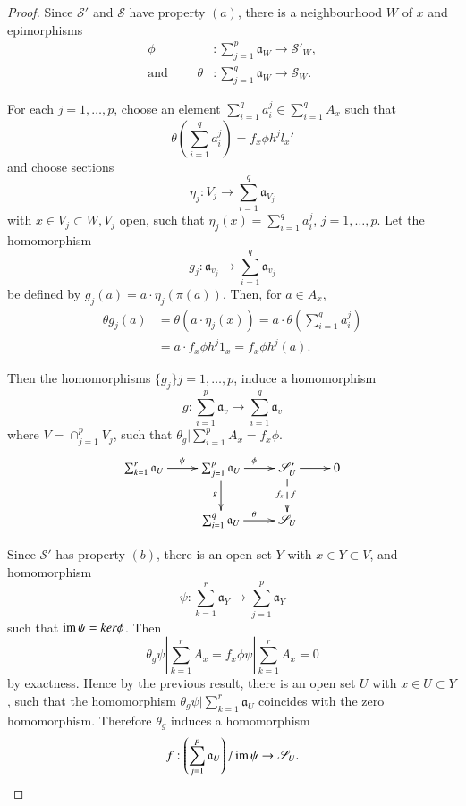 \begin{proof}
Since $\mathscr{S'}$ and $\mathscr{S}$ have property $(a)$, there is a
neighbourhood $W$ of $x$ and epimorphisms 
\begin{align*}
\phi & : \sum^p_{j=1} \mathfrak{a}_W \rightarrow \mathscr{S'}_W , \\
\text{and } \qquad  
\theta & : \sum^q_{j=1} \mathfrak{a}_W \rightarrow \mathscr{S}_W.
\end{align*}

For each $j = 1, \ldots , p$, choose an element $\sum^q_{i=1} a^j_i
\in \sum^q_{i=1} A_x$ such that  
$$
\theta \left(\sum^q_{i=1} a^j_i \right) = f_x \phi h^j l_x'
$$
and choose sections
$$
\eta_j : V_j \rightarrow \sum^q_{i=1} \mathfrak{a}_{V_j} 
$$
with $x \in V_j \subset W, V_j$ open, such that $\eta_j(x) =
\sum^q_{i=1} a^j_i$, $j=1, \ldots , p$. Let the homomorphism 
$$
g_j : \mathfrak{a}_{v_j} \rightarrow \sum^q_{i=1} \mathfrak{a}_{v_j} 
$$
be defined by $g_j(a) = a \cdot \eta_j (\pi (a))$. Then, for $a \in A_x$,
\begin{align*}
\theta g_j (a) & = \theta (a \cdot \eta_j (x)) = a \cdot \theta(\sum^q_{i=1}
a^j_i)\\ 
& = a \cdot f_x \phi h^j 1_x = f_x \phi h^j (a). 
\end{align*}\pageoriginale

Then the homomorphisms $\{g_j \} j = 1, \ldots , p$, induce a
homomorphism  
$$
g : \sum^p_{i=1} \mathfrak{a}_v \rightarrow \sum^q_{i=1} \mathfrak{a}_v
$$ 
where $V = \cap^p_{j=1} V_j $, such that $\theta_g| \sum^p_{i=1}
A_x = f_x \phi$. 
\[
\xymatrix{
\sum^r_{k=1} \mathfrak{a}_U \ar[r]^{\psi} & \sum^p_{j=1}
\mathfrak{a}_U \ar[r]^{\phi} \ar[d]_g & \mathscr{S}'_U
\ar[r]\ar@{-->}[d]^{f}_{f_x} & 0\\
& \sum^q_{i=1} \mathfrak{a}_U \ar[r]^{\theta} & \mathscr{S}_U & 
}
\]

Since $\mathscr{S'}$ has property $(b)$, there is an open set $Y$ with
$x \in Y \subset V$, and homomorphism 
$$
\psi : \sum^r_{k=1} \mathfrak{a}_Y \rightarrow \sum^p_{j=1}
\mathfrak{a}_Y 
$$
such that $\operatorname{im} \psi = ker \phi$. Then 
$$
\theta_g \psi \left| \sum^r_{k=1} A_x = f_x \phi \psi \right|
\sum^r_{k=1} A_x = 0 
$$
by exactness. Hence by the previous result, there is an open set $U$
with $x \in U \subset Y$, such that the homomorphism $\theta_g \psi \Big|
\sum^r_{k=1} \mathfrak{a}_U$ coincides with the zero homomorphism. Therefore
$\theta_g$ induces a homomorphism 
$$
f: \left(\sum^p_{j=1} \mathfrak{a}_U \right) / \operatorname{im} \psi \rightarrow 
\mathscr{S}_U. 
$$


\end{proof}
